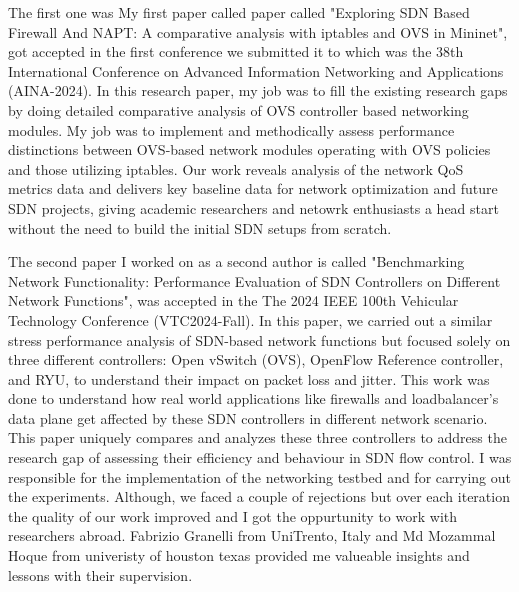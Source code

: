 \documentclass{article}
\begin{document}
The first one was  My first paper called paper called "Exploring SDN Based Firewall And NAPT: A comparative analysis with iptables and OVS in Mininet", got accepted in the first conference we submitted it to which was the 38th International Conference on Advanced Information Networking and Applications (AINA-2024). In this research paper, my job was to fill the existing research gaps by doing detailed comparative analysis of OVS controller based networking modules. My job was to implement and methodically assess performance distinctions between OVS-based network modules operating with OVS policies and those utilizing iptables. Our work  reveals analysis of the network QoS metrics data and delivers key baseline data for network optimization and future SDN projects, giving academic researchers and netowrk enthusiasts a head start without the need to build the initial SDN setups from scratch.

The second paper I worked on as a second author is called "Benchmarking Network Functionality: Performance Evaluation of SDN Controllers on Different Network Functions", was accepted in the The 2024 IEEE 100th Vehicular Technology Conference (VTC2024-Fall). In this paper, we carried out a similar stress performance analysis of SDN-based network functions but focused solely on three different controllers: Open vSwitch (OVS), OpenFlow Reference controller, and RYU, to understand their impact on packet loss and jitter. This work was done to understand how real world applications like firewalls and loadbalancer's data plane get affected by these SDN controllers in different network scenario. This paper uniquely compares and analyzes these three controllers to address the research gap of assessing their efficiency and behaviour in SDN flow control. I was responsible for the implementation of the networking testbed and for carrying out the experiments. Although, we faced a couple of rejections but over each iteration the quality of our work improved and I got the oppurtunity to work with researchers abroad. Fabrizio Granelli from UniTrento, Italy and  Md Mozammal Hoque from univeristy of houston texas provided me valueable insights and lessons with their supervision.
\end{document}
